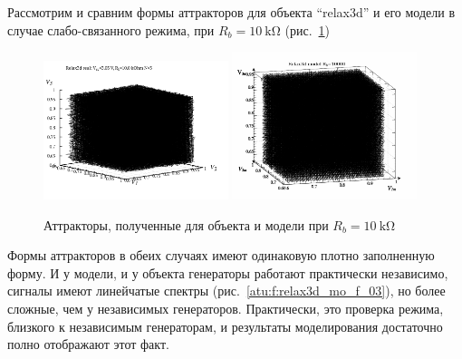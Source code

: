 Рассмотрим и сравним формы аттракторов для объекта ``relax3d'' и его модели
в случае слабо-связанного режима, при $R_b=\SI{10}{\kilo\ohm}$ (рис.~\ref{atu:f:relax3d_mo_v1v2v3m_03})

\begin{figure}[htb!]
  \centerline{
    \hfill
    \includegraphics[width=0.48\textwidth]{p/relax3_v1v2v3_03.png}
    \hfill
    \includegraphics[width=0.48\textwidth]{p/relax3d_read_q-p_v1v2v3m_03a.png}
    \hfill
  }
  \caption{Аттракторы, полученные для объекта и модели при  $R_b=\SI{10}{\kilo\ohm}$}
  \label{atu:f:relax3d_mo_v1v2v3m_03}
\end{figure}

Формы аттракторов в обеих случаях имеют одинаковую плотно заполненную форму.
И у модели, и у объекта генераторы работают практически независимо,
сигналы имеют линейчатые спектры (рис.~\ref{atu:f:relax3d_mo_f_03}),
но более сложные, чем у независимых генераторов. Практически,
это проверка режима, близкого к независимым генераторам, и
результаты моделирования достаточно полно отображают этот факт.


